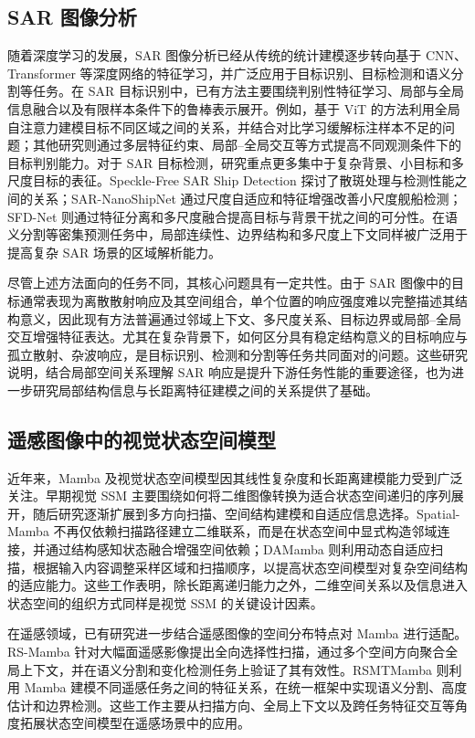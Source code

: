 \documentclass[journal]{IEEEtran}
\begin{document}
\subsection{SAR 图像分析}

随着深度学习的发展，SAR 图像分析已经从传统的统计建模逐步转向基于 CNN、Transformer 等深度网络的特征学习，并广泛应用于目标识别、目标检测和语义分割等任务。在 SAR 目标识别中，已有方法主要围绕判别性特征学习、局部与全局信息融合以及有限样本条件下的鲁棒表示展开。例如，基于 ViT 的方法利用全局自注意力建模目标不同区域之间的关系，并结合对比学习缓解标注样本不足的问题；其他研究则通过多层特征约束、局部--全局交互等方式提高不同观测条件下的目标判别能力。对于 SAR 目标检测，研究重点更多集中于复杂背景、小目标和多尺度目标的表征。Speckle-Free SAR Ship Detection 探讨了散斑处理与检测性能之间的关系\cite{specklefree}；SAR-NanoShipNet 通过尺度自适应和特征增强改善小尺度舰船检测\cite{sarnano}；SFD-Net 则通过特征分离和多尺度融合提高目标与背景干扰之间的可分性\cite{sfdnet}。在语义分割等密集预测任务中，局部连续性、边界结构和多尺度上下文同样被广泛用于提高复杂 SAR 场景的区域解析能力\cite{fusar}。

尽管上述方法面向的任务不同，其核心问题具有一定共性。由于 SAR 图像中的目标通常表现为离散散射响应及其空间组合，单个位置的响应强度难以完整描述其结构意义，因此现有方法普遍通过邻域上下文、多尺度关系、目标边界或局部--全局交互增强特征表达。尤其在复杂背景下，如何区分具有稳定结构意义的目标响应与孤立散射、杂波响应，是目标识别、检测和分割等任务共同面对的问题。这些研究说明，结合局部空间关系理解 SAR 响应是提升下游任务性能的重要途径，也为进一步研究局部结构信息与长距离特征建模之间的关系提供了基础。


\subsection{遥感图像中的视觉状态空间模型}

近年来，Mamba 及视觉状态空间模型因其线性复杂度和长距离建模能力受到广泛关注。早期视觉 SSM 主要围绕如何将二维图像转换为适合状态空间递归的序列展开，随后研究逐渐扩展到多方向扫描、空间结构建模和自适应信息选择。Spatial-Mamba 不再仅依赖扫描路径建立二维联系，而是在状态空间中显式构造邻域连接，并通过结构感知状态融合增强空间依赖\cite{spatialmamba2025}；DAMamba 则利用动态自适应扫描，根据输入内容调整采样区域和扫描顺序，以提高状态空间模型对复杂空间结构的适应能力\cite{damamba2025}。这些工作表明，除长距离递归能力之外，二维空间关系以及信息进入状态空间的组织方式同样是视觉 SSM 的关键设计因素。

在遥感领域，已有研究进一步结合遥感图像的空间分布特点对 Mamba 进行适配。RS-Mamba 针对大幅面遥感影像提出全向选择性扫描，通过多个空间方向聚合全局上下文，并在语义分割和变化检测任务上验证了其有效性\cite{rsmamba2024}。RSMTMamba 则利用 Mamba 建模不同遥感任务之间的特征关系，在统一框架中实现语义分割、高度估计和边界检测\cite{rstmtmamba2025}。这些工作主要从扫描方向、全局上下文以及跨任务特征交互等角度拓展状态空间模型在遥感场景中的应用。
\end{document}
